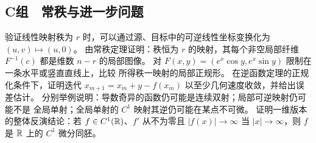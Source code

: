 \subsection*{C组　常秩与进一步问题}
\begin{enumerate}[label=\textbf{\thechapter.\arabic*.},resume]
 验证线性映射秩为 $r$ 时，可以通过源、目标中的可逆线性坐标变换化为
 $(u,v)\mapsto(u,0)$。
 由常秩定理证明：秩恒为 $r$ 的映射，其每个非空局部纤维
 $F^{-1}(c)$ 都是维数 $n-r$ 的局部图像。
 对 $F(x,y)=(e^x\cos y,e^x\sin y)$ 限制在一条水平或竖直直线上，比较
 所得秩一映射的局部正规形。
 在逆函数定理的正规化条件下，证明迭代
 $x_{m+1}=x_m+y-f(x_m)$ 以至少几何速度收敛，并给出误差估计。
 分别举例说明：导数奇异的函数仍可能是连续双射；局部可逆映射仍可能不是
 全局单射；全局单射的 $C^1$ 映射其逆仍可能在某点不可微。
 证明一维版本的整体反演结论：若 $f\in C^1(\mathbb{R})$、$f'$ 从不为零且
 $|f(x)|\to\infty$ 当 $|x|\to\infty$，则 $f$ 是 $\mathbb{R}$ 上的
 $C^1$ 微分同胚。
\end{enumerate}
